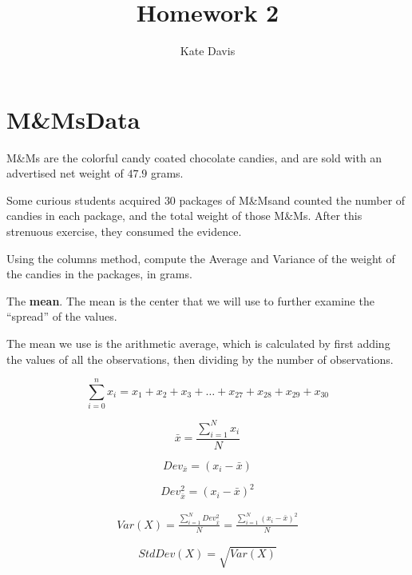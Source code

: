 \documentclass[nohyper,justified]{tufte-handout}\usepackage[]{graphicx}\usepackage[]{color}
\title{Homework 2}
\author{Kate Davis}
\newcommand{\mms}{M\&Ms\textcopyright}
\begin{document}
\maketitle
\section{\mms Data}

\mms {} are the colorful candy coated chocolate candies, and are sold with an advertised net weight of $47.9$ grams.

Some curious students acquired $30$ packages of \mms and counted the number of candies in each package, and the total weight of those \mms. After this strenuous exercise, they consumed the evidence.

Using the columns method, compute the Average and Variance of the weight of the candies in the packages, in grams.


The \textbf{mean}. The mean is the center that we will use to further examine the ``spread'' of the values.

The mean we use is the arithmetic average, which is calculated by first adding the values of all the observations, then dividing by the number of observations.

\begin{equation*}
\sum\limits_{i=0}^{n} x_i = x_1+x_2+x_3+ \dots +x_{27}+x_{28}+x_{29}+x_{30} 
\end{equation*}

\begin{equation*}
\bar{x}=\frac{\sum\limits_{i=1}^{N} x_i }{N} 
\end{equation*}

\begin{equation*}
Dev_{\bar{x}}=(x_i-\bar{x}) 
\end{equation*}

\begin{equation*}
Dev_{\bar{x}}^2=(x_i-\bar{x})^2 
\end{equation*}

\begin{multline*}
Var(X)=\frac{\sum_{i=1}^{N} Dev_{\bar{x}}^2}{N}=\frac{\sum_{i=1}^{N} (x_i-\bar{x})^2}{N}
\end{multline*}

\begin{equation*}
StdDev(X)=\sqrt{Var(X)} 
\end{equation*}
\end{document}
